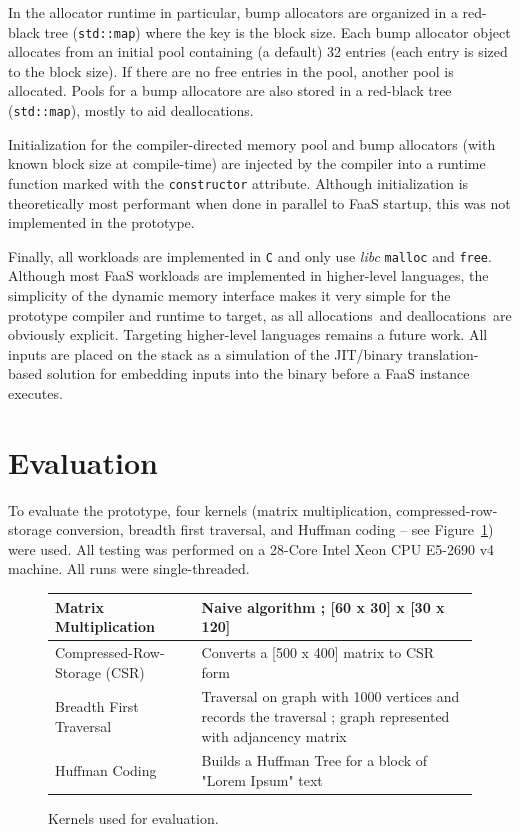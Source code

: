 \documentclass{article}
\def\ALLS{allocations}
\def\DALLS{deallocations}
\begin{document}
In the allocator runtime in particular, bump allocators are organized in a red-black tree (\texttt{std::map})
where the key is the block size. Each bump allocator object allocates from an initial pool
containing (a default) 32 entries (each entry is sized to the block size). If there are no free entries
in the pool, another pool is allocated. Pools for a bump allocatore are also stored in a 
red-black tree (\texttt{std::map}), mostly to aid \DALLS .

Initialization for the compiler-directed memory pool and bump allocators (with known block size at 
compile-time) are injected by the compiler into a runtime function marked with the \texttt{constructor}
attribute. Although initialization is theoretically most performant when done in parallel
to FaaS startup, this was not implemented in the prototype.

Finally, all workloads are implemented in \texttt{C} and only use \textit{libc} \texttt{malloc} and 
\texttt{free}. Although most FaaS workloads are implemented in higher-level languages, the 
simplicity of the dynamic memory interface makes it very simple for the prototype compiler and 
runtime to target, as all \ALLS\ and \DALLS\ are obviously explicit. Targeting higher-level 
languages remains a future work. All inputs are placed on the stack as a simulation of the 
JIT/binary translation-based solution for embedding inputs into the binary before a FaaS 
instance executes.

\section{Evaluation}
To evaluate the prototype, four kernels (matrix multiplication, compressed-row-storage conversion,
breadth first traversal, and Huffman coding -- see Figure~\ref{fig:apps}) were used. All testing
was performed on a 28-Core Intel Xeon CPU E5-2690 v4 machine. All runs were single-threaded.  

\begin{figure}
        \small
        \centering
        \begin{tabular}{ | m{5cm} | m{7cm} | } 
          \hline
            Matrix Multiplication & Naive algorithm ; [60 x 30] x [30 x 120] \\ 
          \hline
            Compressed-Row-Storage (CSR) & Converts a [500 x 400] matrix to CSR form \\ 
          \hline
            Breadth First Traversal & Traversal on graph with 1000 vertices and records the traversal ; graph represented with adjancency matrix  \\ 
          \hline
            Huffman Coding & Builds a Huffman Tree for a block of "Lorem Ipsum" text \\ 
          \hline
        \end{tabular}
        \caption{Kernels used for evaluation.}
        \label{fig:apps}
\end{figure}
\end{document}
